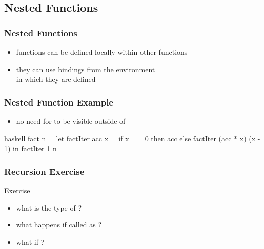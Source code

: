 \documentclass[dvipsnames]{beamer}
\theoremstyle{plain}
\begin{document}
\subsection{Nested Functions}

\begin{frame}
  \frametitle{Nested Functions}

  \begin{itemize}
    \item functions can be defined locally within other functions
    \item they can use bindings from the environment\\
      in which they are defined
  \end{itemize}
\end{frame}

\begin{frame}[fragile]
  \frametitle{Nested Function Example}

  \begin{example}[factorial]
    \begin{itemize}
      \item no need for  to be visible
        outside of 
    \end{itemize}

    \begin{pygments}{haskell}
fact n =
    let
        factIter acc x =
            if x == 0
            then acc
            else factIter (acc * x) (x - 1)
    in
        factIter 1 n
    \end{pygments}
  \end{example}
\end{frame}

\begin{frame}[fragile]
  \frametitle{Recursion Exercise}

  \begin{block}{Exercise}
    \begin{itemize}
      \item what is the type of ?
      \item what happens if called as ?
      \item what if ?
    \end{itemize}
  \end{block}
\end{frame}
\end{document}
